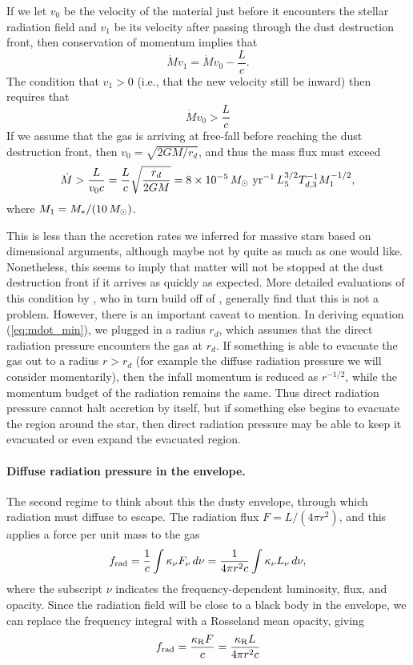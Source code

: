 If we let $v_0$ be the velocity of the material just before it encounters the stellar radiation field and $v_1$ be its velocity after passing through the dust destruction front, then conservation of momentum implies that
\begin{equation}
\dot{M} v_1 = \dot{M} v_0 - \frac{L}{c}.
\end{equation}
The condition that $v_1 > 0$ (i.e., that the new velocity still be inward) then requires that
\begin{equation}
\dot{M} v_0 > \frac{L}{c}
\end{equation}
If we assume that the gas is arriving at free-fall before reaching the dust destruction front, then $v_0 = \sqrt{2 G M/r_d}$, and thus the mass flux must exceed
\begin{equation}
\label{eq:mdot_min}
\dot{M} > \frac{L}{v_0 c} = \frac{L}{c} \sqrt{\frac{r_d}{2 G M}} = 8\times 10^{-5} \,\msun\mbox{ yr}^{-1} \, L_{5}^{3/2} T_{d,3}^{-1} M_{1}^{-1/2},
\end{equation}
where $M_{1}=M_*/(10\,M_{\odot})$.

This is less than the accretion rates we inferred for massive stars based on dimensional arguments, although maybe not by quite as much as one would like. Nonetheless, this seems to imply that matter will not be stopped at the dust destruction front if it arrives as quickly as expected. More detailed evaluations of this condition by \citet{mckee03a}, who in turn build off of \citet{wolfire87a}, generally find that this is not a problem. However, there is an important caveat to mention. In deriving equation (\ref{eq:mdot_min}), we plugged in a radius $r_d$, which assumes that the direct radiation pressure encounters the gas at $r_d$. If something is able to evacuate the gas out to a radius $r > r_d$ (for example the diffuse radiation pressure we will consider momentarily), then the infall momentum is reduced as $r^{-1/2}$, while the momentum budget of the radiation remains the same. Thus direct radiation pressure cannot halt accretion by itself, but if something else begins to evacuate the region around the star, then direct radiation pressure may be able to keep it evacuated or even expand the evacuated region.

\paragraph{Diffuse radiation pressure in the envelope.} The second regime to think about this the dusty envelope, through which radiation must diffuse to escape. The radiation flux $F=L/(4\pi r^2)$, and this applies a force per unit mass to the gas
\begin{equation}
f_{\rm rad} = \frac{1}{c} \int \kappa_{\nu} F_{\nu} \, d\nu = \frac{1}{4\pi r^2 c} \int \kappa_{\nu} L_{\nu} \, d\nu,
\end{equation}
where the subscript $\nu$ indicates the frequency-dependent luminosity, flux, and opacity. Since the radiation field will be close to a black body in the envelope, we can replace the frequency integral with a Rosseland mean opacity, giving
\begin{equation}
f_{\rm rad} = \frac{\kappa_{\rm R} F}{c} = \frac{\kappa_{\rm R} L}{4\pi r^2 c}
\end{equation}

